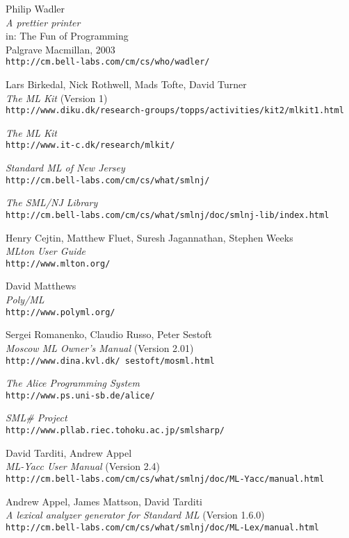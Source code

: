 \documentclass[twoside,titlepage]{article}
\begin{document}
\begin{appendix}
\begin{thebibliography}{MTHM97}
Philip Wadler \\
{\it A prettier printer} \\
in: The Fun of Programming \\
Palgrave Macmillan, 2003 \\
{\small\tt{http://cm.bell-labs.com/cm/cs/who/wadler/}}

Lars Birkedal, Nick Rothwell, Mads Tofte, David Turner \\
{\it The ML Kit} (Version 1) \\
{\small\tt{http://www.diku.dk/research-groups/topps/activities/kit2/mlkit1.html}}

{\it The ML Kit} \\
{\small\tt{http://www.it-c.dk/research/mlkit/}}

{\it Standard ML of New Jersey} \\
{\small\tt{http://cm.bell-labs.com/cm/cs/what/smlnj/}}

{\it The SML/NJ Library} \\
{\small\tt{http://cm.bell-labs.com/cm/cs/what/smlnj/doc/smlnj-lib/index.html}}

Henry Cejtin, Matthew Fluet, Suresh Jagannathan, Stephen Weeks \\
{\it MLton User Guide} \\
{\small\tt{http://www.mlton.org/}}

David Matthews \\
{\it Poly/ML} \\
{\small\tt{http://www.polyml.org/}}

Sergei Romanenko, Claudio Russo, Peter Sestoft \\
{\it Moscow ML Owner's Manual} (Version 2.01) \\
{\small\tt{http://www.dina.kvl.dk/~sestoft/mosml.html}}

{\it The Alice Programming System} \\
{\small\tt{http://www.ps.uni-sb.de/alice/}}

{\it SML\# Project} \\
{\small\tt{http://www.pllab.riec.tohoku.ac.jp/smlsharp/}}

David Tarditi, Andrew Appel \\
{\it ML-Yacc User Manual} (Version 2.4) \\
{\small\tt{http://cm.bell-labs.com/cm/cs/what/smlnj/doc/ML-Yacc/manual.html}}

Andrew Appel, James Mattson, David Tarditi \\
{\it A lexical analyzer generator for Standard ML} (Version 1.6.0) \\
{\small\tt{http://cm.bell-labs.com/cm/cs/what/smlnj/doc/ML-Lex/manual.html}}

\end{thebibliography}


\end{appendix}

\end{document}
